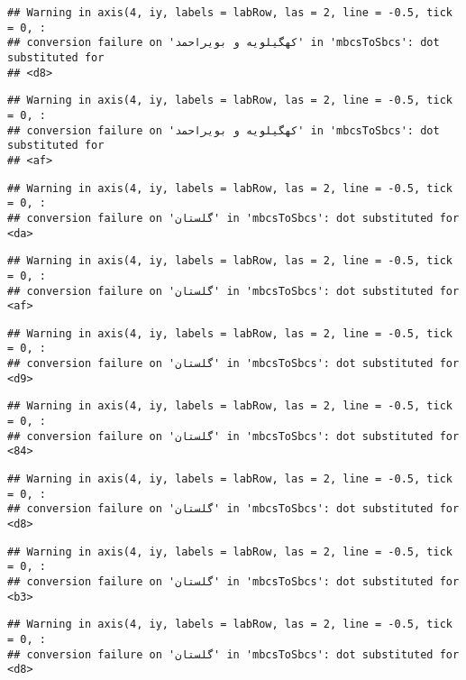 \documentclass[
]{article}
\begin{document}
\begin{verbatim}
## Warning in axis(4, iy, labels = labRow, las = 2, line = -0.5, tick = 0, :
## conversion failure on 'کهگیلویه و بویراحمد' in 'mbcsToSbcs': dot substituted for
## <d8>
\end{verbatim}

\begin{verbatim}
## Warning in axis(4, iy, labels = labRow, las = 2, line = -0.5, tick = 0, :
## conversion failure on 'کهگیلویه و بویراحمد' in 'mbcsToSbcs': dot substituted for
## <af>
\end{verbatim}

\begin{verbatim}
## Warning in axis(4, iy, labels = labRow, las = 2, line = -0.5, tick = 0, :
## conversion failure on 'گلستان' in 'mbcsToSbcs': dot substituted for <da>
\end{verbatim}

\begin{verbatim}
## Warning in axis(4, iy, labels = labRow, las = 2, line = -0.5, tick = 0, :
## conversion failure on 'گلستان' in 'mbcsToSbcs': dot substituted for <af>
\end{verbatim}

\begin{verbatim}
## Warning in axis(4, iy, labels = labRow, las = 2, line = -0.5, tick = 0, :
## conversion failure on 'گلستان' in 'mbcsToSbcs': dot substituted for <d9>
\end{verbatim}

\begin{verbatim}
## Warning in axis(4, iy, labels = labRow, las = 2, line = -0.5, tick = 0, :
## conversion failure on 'گلستان' in 'mbcsToSbcs': dot substituted for <84>
\end{verbatim}

\begin{verbatim}
## Warning in axis(4, iy, labels = labRow, las = 2, line = -0.5, tick = 0, :
## conversion failure on 'گلستان' in 'mbcsToSbcs': dot substituted for <d8>
\end{verbatim}

\begin{verbatim}
## Warning in axis(4, iy, labels = labRow, las = 2, line = -0.5, tick = 0, :
## conversion failure on 'گلستان' in 'mbcsToSbcs': dot substituted for <b3>
\end{verbatim}

\begin{verbatim}
## Warning in axis(4, iy, labels = labRow, las = 2, line = -0.5, tick = 0, :
## conversion failure on 'گلستان' in 'mbcsToSbcs': dot substituted for <d8>
\end{verbatim}
\end{document}
